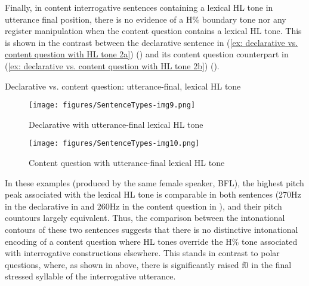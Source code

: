 Finally, in content interrogative sentences containing a lexical HL tone in utterance final position, there is no evidence of a H\% boundary tone nor any register manipulation when the content question contains a lexical HL tone. This is shown in the contrast between the declarative sentence in (\ref{ex: declarative vs. content question with HL tone 2a}) () and its content question counterpart in (\ref{ex: declarative vs. content question with HL tone 2b}) ().

\ea\label{ex: declarative vs. content question with HL tone 2}
{Declarative vs. content question: utterance-final, lexical HL tone}

 \label{ex: declarative vs. content question with HL tone 2a}
        \label{ex: declarative vs. content question with HL tone 2b}
    \z
\z

\begin{figure}
\texttt{[image: figures/SentenceTypes-img9.png]}
\caption{
\label{fig: declarative with HL tone 2}
Declarative with utterance-final lexical HL tone}
\end{figure}

\begin{figure}
\texttt{[image: figures/SentenceTypes-img10.png]}
\caption{
\label{fig: content question with lexical HL tone 2}
Content question with utterance-final lexical HL tone}
\end{figure}

In these examples (produced by the same female speaker, BFL), the highest pitch peak associated with the lexical HL tone is comparable in both sentences (270Hz in the declarative in  and 260Hz in the content question in ), and their pitch countours largely equivalent. Thus, the comparison between the intonational contours of these two sentences suggests that there is no distinctive intonational encoding of a content question where HL tones override the H\% tone associated with interrogative constructions elsewhere. This stands in contrast to polar questions, where, as shown in  above, there is significantly raised f0 in the final stressed syllable of the interrogative utterance.

